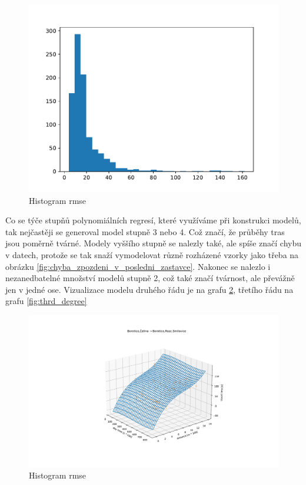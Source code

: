 \begin{figure}
	\centering
  \includegraphics[width=0.4\linewidth]{../img/rmse}
  \caption{Histogram \gls{rmse}}
  \label{fig:rmse}
\end{figure}

\bigbreak

Co se týče stupňů polynomiálních regresí, které využíváme při konstrukci modelů, tak nejčastěji se generoval model stupně 3 nebo 4. Což značí, že průběhy tras jsou poměrně tvárné. Modely vyššího stupně se nalezly také, ale spíše značí chybu v datech, protože se tak snaží vymodelovat různě rozházené vzorky jako třeba na obrázku \ref{fig:chyba_zpozdeni_v_posledni_zastavce}. Nakonec se nalezlo i nezanedbatelné množství modelů stupně 2, což také značí tvárnost, ale převážně jen v jedné ose. Vizualizace modelu druhého řádu je na grafu \ref{fig:second_degree}, třetího řádu na grafu \ref{fig:thrd_degree}


\begin{figure}
	\centering
  \includegraphics[width=1\linewidth]{../img/second_degree}
  \caption{Histogram \gls{rmse}}
  \label{fig:second_degree}
\end{figure}


